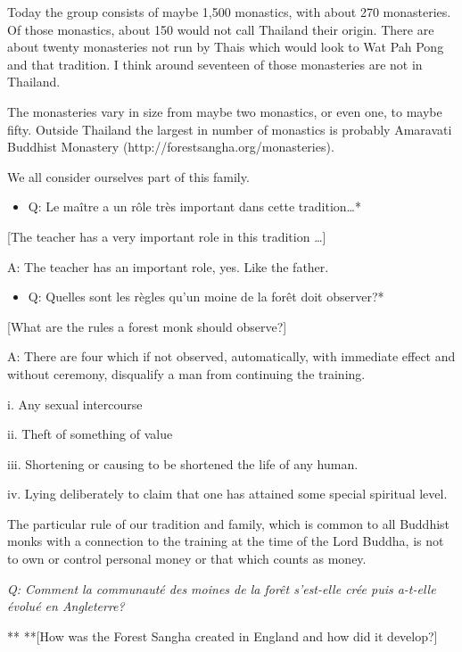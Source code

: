 Today the group consists of maybe 1,500 monastics, with about 270
monasteries. Of those monastics, about 150 would not call Thailand their
origin. There are about twenty monasteries not run by Thais which would
look to Wat Pah Pong and that tradition. I think around seventeen of
those monasteries are not in Thailand.

The monasteries vary in size from maybe two monastics, or even one, to
maybe fifty. Outside Thailand the largest in number of monastics is
probably Amaravati Buddhist Monastery
(http://forestsangha.org/monasteries).

We all consider ourselves part of this family.

\begin{itemize}
\item
  Q: Le maître a un rôle très important dans cette tradition\ldots{}*
\end{itemize}

{[}The teacher has a very important role in this tradition \ldots{}{]}

A: The teacher has an important role, yes. Like the father.

\begin{itemize}
\item
  Q: Quelles sont les règles qu'un moine de la forêt doit observer?*
\end{itemize}

{[}What are the rules a forest monk should observe?{]}

A: There are four which if not observed, automatically, with immediate
effect and without ceremony, disqualify a man from continuing the
training.

i. Any sexual intercourse

ii. Theft of something of value

iii. Shortening or causing to be shortened the life of any human.

iv. Lying deliberately to claim that one has attained some special
spiritual level.

The particular rule of our tradition and family, which is common to all
Buddhist monks with a connection to the training at the time of the Lord
Buddha, is not to own or control personal money or that which counts as
money.

\emph{Q: Comment la communauté des moines de la forêt s'est-elle crée
puis a-t-elle évolué en Angleterre?}

** **{[}How was the Forest Sangha created in England and how did it
develop?{]}


